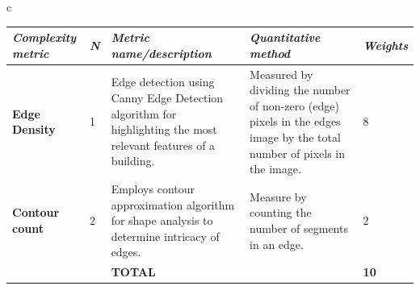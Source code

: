\begin{table}[!htb]
\begin{tabular}{c}
\begin{minipage}{\textwidth}
            \label{tab:MetricsandWeights}
            \begin{tabularx}{\textwidth}{p{3.5cm} p{1cm} X X p{1cm}}
                \toprule
                \textit{Complexity metric} &
                  \textit{N} &
                  \textit{Metric name/description} &
                  \textit{Quantitative   method} &
                  \textit{Weights} \\ \midrule
                \textbf{Edge Density} &
                  1 &
                  Edge detection using Canny Edge Detection algorithm for highlighting the most relevant features of a building.
                    &
                  Measured by dividing the number of non-zero (edge) pixels in the edges image by the total number of pixels in the image.
                    &
                  8\\
                \textbf{Contour count} &
                  2 &
                  Employs contour approximation algorithm for shape analysis to determine intricacy of edges.
                    &
                  Measure by counting the number of segments in an edge.
                    &
                  2\\ \bottomrule
                   &
                   &
                  \textbf{TOTAL} &
                  &
                  \textbf{10}\\ \bottomrule
            \end{tabularx}
        \end{minipage}
    \end{tabular}
\end{table}

